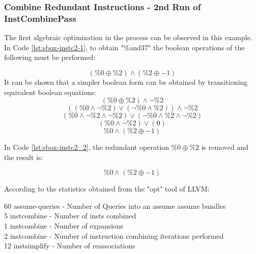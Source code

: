 \begin{minipage}{\linewidth}

\end{minipage}


\subsubsection{Combine Redundant Instructions - 2nd Run of InstCombinePass}





The first algebraic optimization in the process can be observed in this example. In Code \ref{lst:sbox-instc2-1}, to obtain "\%and37" the boolean operations of the following must be performed:

$$ (\%0 \oplus \%2)  \land ( \%2 \oplus -1)  $$
It can be shown that a simpler boolean form can be obtained by transitioning equivalent boolean equations:
$$ (\%0 \oplus \%2)  \land  \lnot \%2   $$
$$ ((\%0 \land \lnot \%2) \lor (\lnot \%0 \land \%2))  \land  \lnot \%2   $$
$$ (\%0 \land \lnot \%2\land  \lnot \%2) \lor (\lnot \%0 \land \%2\land  \lnot \%2)     $$
$$ (\%0 \land \lnot \%2) \lor (0)     $$
$$ \%0 \land (\%2 \oplus -1) $$

In Code \ref{lst:sbox-instc2_2}, the redundant operation $\%0 \oplus \%2$ is removed and the result is: 

$$ \%0  \land ( \%2 \oplus -1)  $$

According to the statistics obtained from the "opt" tool of LLVM:
\begin{displayquote}
60 assume-queries - Number of Queries into an assume assume bundles \\
 5 instcombine    - Number of insts combined \\
 1 instcombine    - Number of expansions \\
 2 instcombine    - Number of instruction combining iterations performed \\ 
12 instsimplify   - Number of reassociations \\
\end{displayquote}

